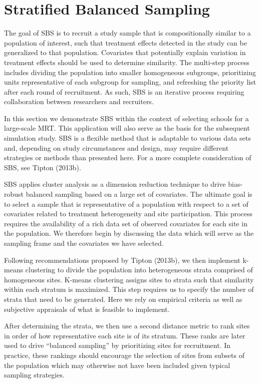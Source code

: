 \documentclass[
  english,
  man,floatsintext]{apa6}
\begin{document}
\hypertarget{stratified-balanced-sampling}{%
\section{Stratified Balanced Sampling}\label{stratified-balanced-sampling}}

The goal of SBS is to recruit a study sample that is compositionally similar to a population of interest, such that treatment effects detected in the study can be generalized to that population. Covariates that potentially explain variation in treatment effects should be used to determine similarity. The multi-step process includes dividing the population into smaller homogeneous subgroups, prioritizing units representative of each subgroup for sampling, and refreshing the priority list after each round of recruitment. As such, SBS is an iterative process requiring collaboration between researchers and recruiters.

In this section we demonstrate SBS within the context of selecting schools for a large-scale MRT. This application will also serve as the basis for the subsequent simulation study. SBS is a flexible method that is adaptable to various data sets and, depending on study circumstances and design, may require different strategies or methods than presented here. For a more complete consideration of SBS, see Tipton (2013b).

SBS applies cluster analysis as a dimension reduction technique to drive bias-robust balanced sampling based on a large set of covariates. The ultimate goal is to select a sample that is representative of a population with respect to a set of covariates related to treatment heterogeneity and site participation. This process requires the availability of a rich data set of observed covariates for each site in the population. We therefore begin by discussing the data which will serve as the sampling frame and the covariates we have selected.

Following recommendations proposed by Tipton (2013b), we then implement k-means clustering to divide the population into heterogeneous strata comprised of homogeneous sites. K-means clustering assigns sites to strata such that similarity within each stratum is maximized. This step requires us to specify the number of strata that need to be generated. Here we rely on empirical criteria as well as subjective appraisals of what is feasible to implement.

After determining the strata, we then use a second distance metric to rank sites in order of how representative each site is of its stratum. These ranks are later used to drive \enquote{balanced sampling} by prioritizing sites for recruitment. In practice, these rankings should encourage the selection of sites from subsets of the population which may otherwise not have been included given typical sampling strategies.
\end{document}
